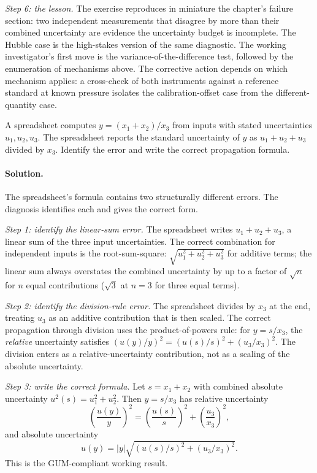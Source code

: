 \emph{Step 6: the lesson.} The exercise reproduces in miniature the
chapter's failure section: two independent measurements that
disagree by more than their combined uncertainty are evidence the
uncertainty budget is incomplete. The Hubble case is the
high-stakes version of the same diagnostic. The working
investigator's first move is the variance-of-the-difference test,
followed by the enumeration of mechanisms above. The corrective
action depends on which mechanism applies: a cross-check of both
instruments against a reference standard at known pressure
isolates the calibration-offset case from the different-quantity
case.

\begin{exercise}
A spreadsheet computes $y = (x_{1} + x_{2}) / x_{3}$ from inputs
with stated uncertainties $u_{1}, u_{2}, u_{3}$. The spreadsheet
reports the standard uncertainty of $y$ as $u_{1} + u_{2} + u_{3}$
divided by $x_{3}$. Identify the error and write the correct
propagation formula.
\end{exercise}

\paragraph{Solution.}
The spreadsheet's formula contains two structurally different
errors. The diagnosis identifies each and gives the correct form.

\emph{Step 1: identify the linear-sum error.} The spreadsheet
writes $u_{1} + u_{2} + u_{3}$, a linear sum of the three input
uncertainties. The correct combination for independent inputs is
the root-sum-square: $\sqrt{u_{1}^{2} + u_{2}^{2} + u_{3}^{2}}$
for additive terms; the linear sum always overstates the combined
uncertainty by up to a factor of $\sqrt{n}$ for $n$ equal
contributions ($\sqrt{3}$ at $n = 3$ for three equal terms).

\emph{Step 2: identify the division-rule error.} The spreadsheet
divides by $x_{3}$ at the end, treating $u_{3}$ as an additive
contribution that is then scaled. The correct propagation through
division uses the product-of-powers rule: for $y = s/x_{3}$, the
\emph{relative} uncertainty satisfies $(u(y)/y)^{2} =
(u(s)/s)^{2} + (u_{3}/x_{3})^{2}$. The division enters as a
relative-uncertainty contribution, not as a scaling of the
absolute uncertainty.

\emph{Step 3: write the correct formula.} Let $s = x_{1} + x_{2}$
with combined absolute uncertainty $u^{2}(s) = u_{1}^{2} + u_{2}^{2}$.
Then $y = s/x_{3}$ has relative uncertainty
\[
\left(\frac{u(y)}{y}\right)^{2} =
\left(\frac{u(s)}{s}\right)^{2} +
\left(\frac{u_{3}}{x_{3}}\right)^{2},
\]
and absolute uncertainty
\[
u(y) = |y| \sqrt{(u(s)/s)^{2} + (u_{3}/x_{3})^{2}}.
\]
This is the GUM-compliant working result.

